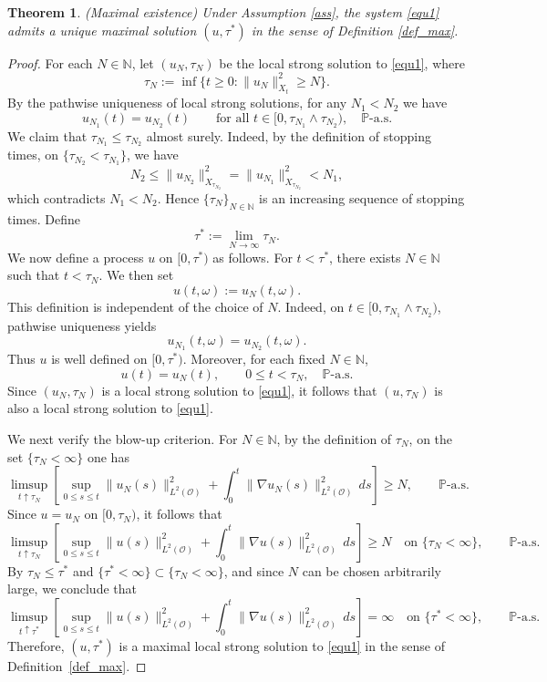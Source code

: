 \documentclass[reqno, 11pt]{amsart}
\newtheorem{thm}{Theorem}
\theoremstyle{definition}
\numberwithin{equation}{section} \numberwithin{lem}{section}
\numberwithin{thm}{section} \numberwithin{prop}{section}
\numberwithin{cor}{section} \numberwithin{rem}{section}
\numberwithin{defn}{section}
\begin{document}
\begin{thm}(Maximal existence)
    Under Assumption \ref{ass}, the system \eqref{equ1}  admits a unique maximal solution $(u,\tau^*)$ in the sense of Definition \ref{def_max}.
\end{thm}
\begin{proof}
For each $N\in\mathbb N$, let $(u_N,\tau_N)$ be the local strong solution to \eqref{equ1}, where
\[
\tau_N:=\inf\{t\ge0:\|u_N\|_{X_t}^2\ge N\}.
\] 
By the pathwise uniqueness of local strong solutions, for any $N_1<N_2$ we have
\[
u_{N_1}(t)=u_{N_2}(t)\qquad \text{for all } t\in[0,\tau_{N_1}\wedge{\tau_{N_2}}),\quad \mathbb P\text{-a.s.}
\]
We claim  that $\tau_{N_1}\le \tau_{N_2}$ almost surely. Indeed, by the definition of stopping times, on $\{\tau_{N_2}<\tau_{N_1}\}$,  we have
\[
N_2\le \|u_{N_2}\|_{X_{\tau_{N_2}}}^2=\|u_{N_1}\|_{X_{\tau_{N_2}}}^2<N_1,
\]
which contradicts $N_1<N_2$.
Hence $\{\tau_N\}_{N\in\mathbb N}$ is an increasing sequence of stopping times. Define
\[
\tau^*:=\lim_{N\to\infty}\tau_N.
\]
We now define a process $u$ on $[0,\tau^*)$ as follows. For 
	$t<\tau^*$, there exists $N\in\mathbb{N}$ such that $t<\tau_N$. We then  set
	\[
	u(t,\omega):=u_N(t,\omega).
	\]
	This definition is independent of the choice of $N$. Indeed, on 
	$t\in[0,\tau_{N_1}\wedge\tau_{N_2})$, pathwise uniqueness yields
	\[
	u_{N_1}(t,\omega)=u_{N_2}(t,\omega).
	\]
  	Thus $u$ is well defined on $[0,\tau^*)$. Moreover, for each fixed
	$N\in\mathbb N$,
	\[
	u(t)=u_N(t),
	\qquad 0\le t<\tau_N,
	\quad \mathbb P\text{-a.s.}
	\]
	Since $(u_N,\tau_N)$ is a local strong solution to \eqref{equ1}, it follows
	that $(u,\tau_N)$ is also a local strong solution to \eqref{equ1}.

	We next verify the blow-up criterion. For  $N\in\mathbb N$, by the definition
	of $\tau_N$, on the set $\{\tau_N<\infty\}$ one has
    \[
\limsup_{t\uparrow\tau_N}
\left[
\sup_{0\le s\le t}\|u_N(s)\|_{L^2(\mathcal O)}^2
+
\int_0^t\|\nabla u_N(s)\|_{L^2(\mathcal O)}^2\,ds
\right]\ge N,
\qquad\mathbb P\text{-a.s.}
\]
    Since $u=u_N$ on $[0,\tau_N)$, it follows that
	\[
\limsup_{t\uparrow\tau_N}
\left[
\sup_{0\le s\le t}\|u(s)\|_{L^2(\mathcal O)}^2
+
\int_0^t\|\nabla u(s)\|_{L^2(\mathcal O)}^2\,ds
\right]
\ge N
\quad\text{on }\{\tau_N<\infty\},
\qquad\mathbb P\text{-a.s.}
\]
By $\tau_N\le \tau^*$ and  $\{{\tau^*}<\infty\}\subset \{\tau_N<\infty\}$, and since \(N\) can be chosen arbitrarily
large, we conclude that
\[
\limsup_{t\uparrow\tau^*}
\left[
\sup_{0\le s\le t}\|u(s)\|_{L^2(\mathcal O)}^2
+
\int_0^t\|\nabla u(s)\|_{L^2(\mathcal O)}^2\,ds
\right]
=\infty
\quad\text{on }\{\tau^*<\infty\},
\qquad\mathbb P\text{-a.s.}
\]
    	Therefore, \((u,\tau^*)\) is a maximal local strong solution to
\eqref{equ1} in the sense of Definition~\ref{def_max}.
\end{proof}
\end{document}
